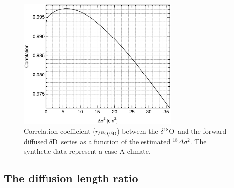 \documentclass[11pt, draftcls, onecolumn]{IEEEtran} %
\numberwithin{equation}{section}
\numberwithin{table}{section}
\numberwithin{figure}{section}
\newcommand{\delOx}{$\delta{}^{18}\mathrm{O}$}
\newcommand{\delD}{$\delta\mathrm{D}$}
\newcommand{\delcorrel}{$r_{\delta{}^{18}\mathrm{O}/\delta\mathrm{D}}$}
\begin{document}
\begin{figure}[]	
	\vspace*{2mm}	
	\begin{center}		
		\includegraphics[width=0.7\textwidth]{Figure_9}		
		\caption{Correlation coefficient (\delcorrel) between the \delOx~and the forward--diffused \delD~series 
		as a function of the estimated ${}^{18}\Delta\sigma^2$.  
		The synthetic data represent a case A climate.} 		
		\label{fig:correlation_example}	
	\end{center}
\end{figure}


\subsection{The diffusion length ratio}
\end{document}
